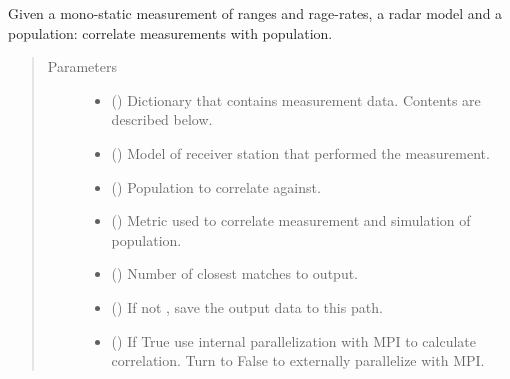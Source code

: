 \documentclass[letterpaper,10pt,english]{sphinxmanual}
\begin{document}
\begin{fulllineitems}
\label{\detokenize{modules/correlator:correlator.correlate}}
Given a mono-static measurement of ranges and rage-rates, a radar model and a population: correlate measurements with population.
\begin{quote}\begin{description}
\item[{Parameters}] \leavevmode\begin{itemize}
\item {} 
 () \textendash{} Dictionary that contains measurement data. Contents are described below.

\item {} 
 ({\hyperref[\detokenize{modules/antenna:antenna.AntennaRX}]{}}) \textendash{} Model of receiver station that performed the measurement.

\item {} 
 ({\hyperref[\detokenize{modules/population:population.Population}]{}}) \textendash{} Population to correlate against.

\item {} 
 () \textendash{} Metric used to correlate measurement and simulation of population.

\item {} 
 () \textendash{} Number of closest matches to output.

\item {} 
 () \textendash{} If not , save the output data to this path.

\item {} 
 () \textendash{} If True use internal parallelization with MPI to calculate correlation. Turn to False to externally parallelize with MPI.


\end{itemize}
\end{description}
\end{quote}
\end{fulllineitems}
\end{document}
